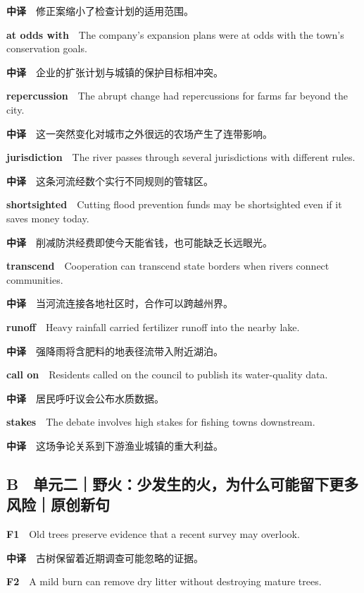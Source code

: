\documentclass[
  11pt,
]{ctexart}
\begin{document}
\textbf{中译}　修正案缩小了检查计划的适用范围。

\textbf{at odds with}　The company's expansion plans were at odds with
the town's conservation goals.

\textbf{中译}　企业的扩张计划与城镇的保护目标相冲突。

\textbf{repercussion}　The abrupt change had repercussions for farms far
beyond the city.

\textbf{中译}　这一突然变化对城市之外很远的农场产生了连带影响。

\textbf{jurisdiction}　The river passes through several jurisdictions
with different rules.

\textbf{中译}　这条河流经数个实行不同规则的管辖区。

\textbf{shortsighted}　Cutting flood prevention funds may be
shortsighted even if it saves money today.

\textbf{中译}　削减防洪经费即使今天能省钱，也可能缺乏长远眼光。

\textbf{transcend}　Cooperation can transcend state borders when rivers
connect communities.

\textbf{中译}　当河流连接各地社区时，合作可以跨越州界。

\textbf{runoff}　Heavy rainfall carried fertilizer runoff into the
nearby lake.

\textbf{中译}　强降雨将含肥料的地表径流带入附近湖泊。

\textbf{call on}　Residents called on the council to publish its
water-quality data.

\textbf{中译}　居民呼吁议会公布水质数据。

\textbf{stakes}　The debate involves high stakes for fishing towns
downstream.

\textbf{中译}　这场争论关系到下游渔业城镇的重大利益。

\subsection{B　单元二｜野火：少发生的火，为什么可能留下更多风险｜原创新句}\label{b-ux5355ux5143ux4e8cux91ceux706bux5c11ux53d1ux751fux7684ux706bux4e3aux4ec0ux4e48ux53efux80fdux7559ux4e0bux66f4ux591aux98ceux9669ux539fux521bux65b0ux53e5}

\textbf{F1}　Old trees preserve evidence that a recent survey may
overlook.

\textbf{中译}　古树保留着近期调查可能忽略的证据。

\textbf{F2}　A mild burn can remove dry litter without destroying mature
trees.
\end{document}
